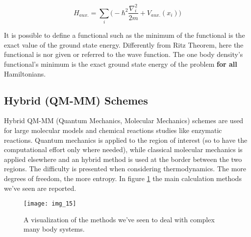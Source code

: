 $$H_{aux.} = \sum_i \bigg(-\hbar^2 \frac{\nabla_i^2}{2m} + V_{aux.}(x_i) \bigg)$$

It is possible to define a functional such as the minimum of the functional is the exact value of the ground state energy.
Differently from Ritz Theorem, here the functional is nor given or referred to the wave function.
The one body density's functional's minimum is the exact ground state energy of the problem \textbf{for all} Hamiltonians.

\subsection{Hybrid (QM-MM) Schemes}
Hybrid QM-MM (Quantum Mechanics, Molecular Mechanics) schemes are used for large molecular models and chemical reactions studies like enzymatic reactions.
Quantum mechanics is applied to the region of interest (so to have the computational effort only where needed),  while classical molecular mechanics is applied elsewhere and an hybrid method is used at the border between the two regions.
The difficulty is presented when considering thermodynamics. The more degrees of freedom, the more entropy.
In figure \ref{fig:summary} the main calculation methods we've seen are reported.

\begin{figure}[htbp!]
	\centering
	\texttt{[image: img\_15]}
	\caption{A visualization of the methods we've seen to deal with complex many body systems.}
	\label{fig:summary}
\end{figure}
